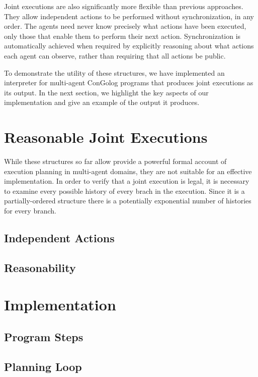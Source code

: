 Joint executions are also significantly more flexible than previous
approaches. They allow independent actions to be performed without
synchronization, in any order. The agents need never know precisely
what actions have been executed, only those that enable them to perform
their next action. Synchronization is automatically achieved when
required by explicitly reasoning about what actions each agent can
observe, rather than requiring that all actions be public.

To demonstrate the utility of these structures, we have implemented
an interpreter for multi-agent ConGolog programs that produces joint
executions as its output. In the next section, we highlight the key
aspects of our implementation and give an example of the output it
produces.


\section{Reasonable Joint Executions}

While these structures so far allow provide a powerful formal account
of execution planning in multi-agent domains, they are not suitable
for an effective implementation. In order to verify that a joint execution
is legal, it is necessary to examine every possible history of every
brach in the execution. Since it is a partially-ordered structure
there is a potentially exponential number of histories for every branch.


\subsection{Independent Actions\label{sec:JointExec:IndepActs}}


\subsection{Reasonability}


\section{Implementation\label{sec:JointExec:Implementation}}




\subsection{Program Steps}


\subsection{Planning Loop}


